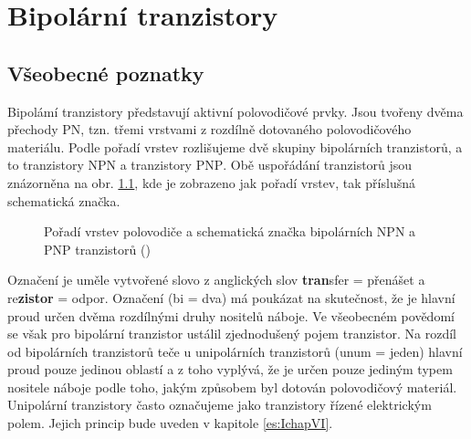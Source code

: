 \setchaptertoc
\chapter{Bipolární tranzistory}\label{es:IchapV}
  \section{Všeobecné poznatky}\label{es:IchapVsecI}
    Bipolámí tranzistory představují aktivní polovodičové prvky. Jsou tvořeny dvěma přechody PN,
    tzn. třemi vrstvami z rozdílně dotovaného polovodičového materiálu. Podle pořadí vrstev
    rozlišujeme dvě skupiny bipolárních tranzistorů, a to tranzistory \textsc{NPN} a tranzistory
    \textsc{PNP}. Obě uspořádání tranzistorů jsou znázorněna na obr. \ref{teo:fig053}, kde je
    zobrazeno jak pořadí vrstev, tak příslušná schematická značka.

    \begin{figure}[ht!]
      \centering  
          \hspace{1em}
          \newline
          \hspace{1em}
      \caption{Pořadí vrstev polovodiče a schematická značka bipolárních NPN a PNP 
      tranzistorů (\cite[s.~112]{Frohn2006})}
      \label{teo:fig053}
    \end{figure}
    
    Označení  je uměle vytvořené slovo z anglických slov \textbf{tran}sfer = přenášet
    a re\textbf{zistor} = odpor. Označení  (bi = dva) má poukázat na skutečnost, že je
    hlavní proud určen dvěma rozdílnými druhy nositelů náboje. Ve všeobecném povědomí se však pro
    bipolární tranzistor ustálil zjednodušený pojem tranzistor. Na rozdíl od bipolárních tranzistorů
    teče u unipolárních tranzistorů (unum = jeden) hlavní proud pouze jedinou oblastí a z toho
    vyplývá, že je určen pouze jediným typem nositele náboje podle toho, jakým způsobem byl dotován
    polovodičový materiál. Unipolární tranzistory často označujeme jako tranzistory řízené
    elektrickým polem. Jejich princip bude uveden v kapitole \ref{es:IchapVI}.
    
